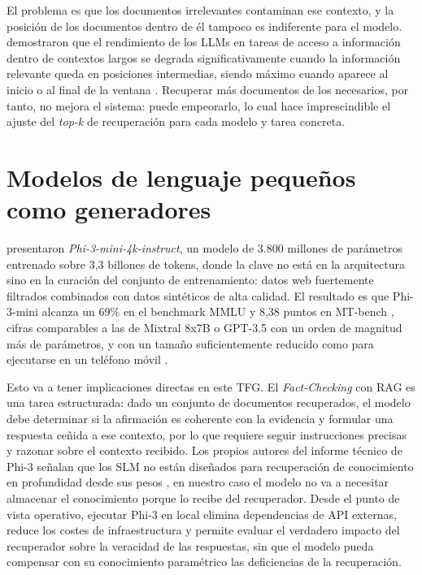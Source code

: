 El problema es que los documentos irrelevantes contaminan ese contexto, y la posición de los documentos dentro de él tampoco es indiferente para el modelo. \citet{liu2024lost} demostraron que el rendimiento de los LLMs en tareas de acceso a información dentro de contextos largos se degrada significativamente cuando la información relevante queda en posiciones intermedias, siendo máximo cuando aparece al inicio o al final de la ventana \cite{liu2024lost}. Recuperar más documentos de los necesarios, por tanto, no mejora el sistema: puede empeorarlo, lo cual hace imprescindible el ajuste del \textit{top-k} de recuperación para cada modelo y tarea concreta.

\section{Modelos de lenguaje pequeños como generadores}

\citet{abdin2024phi3} presentaron \textit{Phi-3-mini-4k-instruct}, un modelo de 3.800 millones de parámetros entrenado sobre 3,3 billones de tokens, donde la clave no está en la arquitectura sino en la curación del conjunto de entrenamiento: datos web fuertemente filtrados combinados con datos sintéticos de alta calidad. El resultado es que Phi-3-mini alcanza un 69\% en el benchmark MMLU y 8,38 puntos en MT-bench \cite{abdin2024phi3}, cifras comparables a las de Mixtral 8x7B o GPT-3.5 \cite{abdin2024phi3} con un orden de magnitud más de parámetros, y con un tamaño suficientemente reducido como para ejecutarse en un teléfono móvil \cite{abdin2024phi3}.

Esto va a tener implicaciones directas en este TFG. El \textit{Fact-Checking} con RAG es una tarea estructurada: dado un conjunto de documentos recuperados, el modelo debe determinar si la afirmación es coherente con la evidencia y formular una respuesta ceñida a ese contexto, por lo que requiere seguir instrucciones precisas y razonar sobre el contexto recibido. Los propios autores del informe técnico de Phi-3 señalan que los SLM no están diseñados para recuperación de conocimiento en profundidad desde sus pesos \cite{abdin2024phi3}, en nuestro caso el modelo no va a necesitar almacenar el conocimiento porque lo recibe del recuperador. Desde el punto de vista operativo, ejecutar Phi-3 en local elimina dependencias de API externas, reduce los costes de infraestructura y permite evaluar el verdadero impacto del recuperador sobre la veracidad de las respuestas, sin que el modelo pueda compensar con su conocimiento paramétrico las deficiencias de la recuperación.


